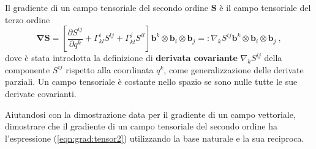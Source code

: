 \noindent
Il gradiente di un campo tensoriale del secondo ordine $\bm{S}$ è il campo tensoriale del terzo ordine
 \begin{equation}\label{eqn:grad:tensor2}
   \bm{\nabla} \bm{S} = \left[ \dfrac{\partial S^{ij}}{\partial q^k} + \Gamma_{kl}^i S^{lj} + \Gamma_{kl}^j S^{il} \right]
                \bm{b}^k \otimes \bm{b}_i \otimes \bm{b}_j =: \nabla_k S^{ij} \bm{b}^k \otimes \bm{b}_i \otimes \bm{b}_j \ ,
 \end{equation}
 dove è stata introdotta la definizione di \textbf{derivata covariante} $\nabla_k S^{ij}$ della componente $S^{ij}$ rispetto alla coordinata $q^k$, come generalizzazione delle derivate parziali. Un campo tensoriale è costante nello spazio se sono nulle tutte le sue derivate covarianti.
\begin{exercise}
 Aiutandosi con la dimostrazione data per il gradiente di un campo vettoriale, dimostrare che il gradiente di un campo tensoriale del secondo ordine ha l'espressione (\ref{eqn:grad:tensor2}) utilizzando la base naturale e la sua reciproca.
\end{exercise}
%

